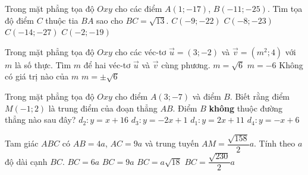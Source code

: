 \begin{ex}%
	Trong mặt phẳng tọa độ $Oxy$ cho các điểm $A(1;-17)$, $B(-11;-25)$. Tìm tọa độ điểm $C$ thuộc tia $BA$ sao cho $BC=\sqrt{13}$.
	\choice
	{$C(-9;-22)$}	
	{\True $C(-8;-23)$}
	{$C(-14;-27)$}
	{$C(-2;-19)$}
\end{ex}
\begin{ex}%
	Trong mặt phẳng tọa độ $Oxy$ cho các véc-tơ $\vec{u}=(3;-2)$ và $\vec{v}=(m^2;4)$ với $m$ là số thực. Tìm $m$ để hai véc-tơ $\vec{u}$ và $\vec{v}$ cùng phương.
	\choice
	{$m=\sqrt{6}$}
	{$m=-6$}
	{\True Không có giá trị nào của $m$}	
	{$m=\pm\sqrt{6}$}
\end{ex}
\begin{ex}%
	Trong mặt phẳng tọa độ $Oxy$ cho điểm $A(3;-7)$ và  điểm $B$. Biết rằng điểm $M(-1;2)$ là trung điểm của đoạn thẳng $AB$. Điểm $B$ \textbf{không} thuộc đường thẳng nào sau đây?
	\choice
	{$d_2 : y=x+16$}
	{$d_3 : y=-2x+1$}
	{\True $d_1: y=2x+11$}	
	{$d_4 : y=-x+6$}
\end{ex}
\begin{ex}%
	Tam giác $ABC$ có $AB=4a$, $AC=9a$ và trung tuyến $AM=\dfrac{\sqrt{158}}{2}a$. Tính theo $a$ độ dài cạnh $BC$.
	\choice
	{\True $BC = 6a$}
	{$BC =9a$}
	{$BC =a\sqrt{18}$}
	{$BC =\dfrac{\sqrt{230}}{2}a$}
\end{ex}
